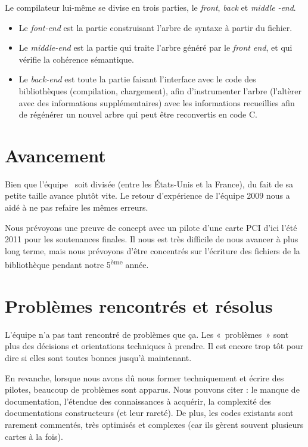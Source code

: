 \documentclass[francais]{rtxreport}
\begin{document}
Le compilateur lui-même se divise en trois parties, le \emph{front},
\emph{back} et \emph{middle} \emph{-end}.

\begin{itemize}
	\item Le \emph{font-end} est la partie construisant l’arbre de syntaxe à partir du
	fichier.
	\item Le \emph{middle-end} est la partie qui traite l’arbre généré par le
	\emph{front end}, et qui vérifie la cohérence sémantique.
	\item Le \emph{back-end} est toute la partie faisant l’interface avec
	le code des bibliothèques (compilation, chargement), afin
	d'instrumenter l'arbre (l’altèrer avec des informations
	supplémentaires) avec les informations recueillies afin de régénérer un
	nouvel arbre qui peut être reconvertis en code C.
\end{itemize}

\section{Avancement}

Bien que l'équipe \rtx\ soit divisée (entre les États-Unis et la France), du
fait de sa petite taille avance plutôt vite. Le retour d'expérience de l'équipe
2009 nous a aidé à ne pas refaire les mêmes erreurs.

Nous prévoyons une preuve de concept avec un pilote d’une carte PCI d’ici l'été
2011 pour les soutenances finales. Il nous est très difficile de nous avancer à
plus long terme, mais nous prévoyons d’être concentrés sur l’écriture des
fichiers de la bibliothèque pendant notre 5\textsuperscript{ème} année.

\section{Problèmes rencontrés et résolus}

L’équipe n’a pas tant rencontré de problèmes que ça. Les «~problèmes~» sont plus
des décisions et orientations techniques à prendre. Il est encore trop tôt pour
dire si elles sont toutes bonnes jusqu’à maintenant.

En revanche, lorsque nous avons dû nous former techniquement et écrire des
pilotes, beaucoup de problèmes sont apparus. Nous pouvons citer : le manque de
documentation, l’étendue des connaissances à acquérir, la complexité des
documentations constructeurs (et leur rareté). De plus, les codes existants sont
rarement commentés, très optimisés et complexes (car ils gèrent souvent
plusieurs cartes à la fois).
\end{document}
